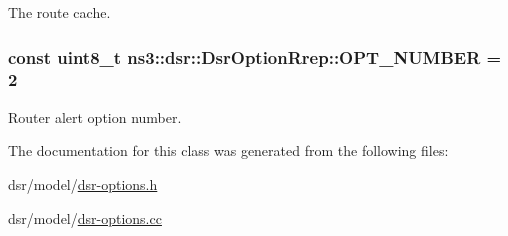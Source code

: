 The route cache. 

\subsubsection[{\texorpdfstring{O\+P\+T\+\_\+\+N\+U\+M\+B\+ER}{OPT_NUMBER}}]{\setlength{\rightskip}{0pt plus 5cm}const uint8\+\_\+t ns3\+::dsr\+::\+Dsr\+Option\+Rrep\+::\+O\+P\+T\+\_\+\+N\+U\+M\+B\+ER = 2\hspace{0.3cm}{\ttfamily [static]}}\hypertarget{classns3_1_1dsr_1_1DsrOptionRrep_ab7202d71702f2935c407f57f95ccafcd}{}\label{classns3_1_1dsr_1_1DsrOptionRrep_ab7202d71702f2935c407f57f95ccafcd}


Router alert option number. 



The documentation for this class was generated from the following files\+:\begin{DoxyCompactItemize}
\item 
dsr/model/\hyperlink{dsr-options_8h}{dsr-\/options.\+h}\item 
dsr/model/\hyperlink{dsr-options_8cc}{dsr-\/options.\+cc}\end{DoxyCompactItemize}
